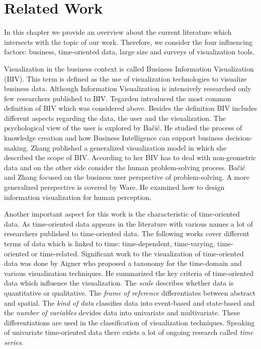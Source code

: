 \chapter{Related Work}
\label{chap:related Work}
In this chapter we provide an overview about the current literature which intersects with the topic of our work. Therefore, we consider the four influencing factors: business, time-oriented data, large size and surveys of visualization tools. 
\par
Visualization in the business context is called Business Information Visualization (BIV). This term is defined as the use of visualization technologies to visualize business data\cite{Tegarden1999}. Although Information Visualization is intensively researched\cite{Shneiderman2008,Shneiderman2002,Shneiderman1996,Keim2002} only few researchers published to BIV. Tegarden\cite{Tegarden1999} introduced the most common definition of BIV which was considered above.  Besides the definition BIV includes different aspects regarding the data, the user and the visualization. The psychological view of the user is explored by Bačić. He studied the process of knowledge creation\cite{Bacic2012} and how Business Intelligence can support business decision-making\cite{Bacic,Bacic2012}.  Zhang\cite{Zhang,Zhang1998,Zhang2001} published a generalized visualization model in which she described the scope of BIV. According to her BIV has to deal with non-geometric data and on the other side consider the human problem-solving process. Bačić and Zhang focused on the business user perspective of problem-solving. A more generalized perspective is covered by Ware\cite{Ware2012a}. He examined how to design information visualization for human perception.
\par
Another important aspect for this work is the characteristic of time-oriented data. As time-oriented data appears in the literature with various names a lot of researchers published to time-oriented data. The following works cover different terms of data which is linked to time:  time-dependent\cite{Postfach2003, Tominski2005,Kriglstein2014,Aigner2007,VanBuuren2001,FerreiradeOliveira2003,Yang2003,Chung2014,Rind2011}, time-varying\cite{Moere2004}, time-oriented\cite{Aigner2008,Aigner2007,Aigner2011,Hinum2005,Walker} or time-related\cite{Keimc}. Significant work to the visualization of time-oriented data was done by Aigner\cite{Aigner2011,Aigner2008,Aigner2007} who proposed a taxonomy for the time-domain and various visualization techniques. He summarized the key criteria of time-oriented data which influence the visualization. The \textit{scale} describes whether data is quantitative or qualitative. The \textit{frame of reference} differentiates between abstract and spatial. The \textit{kind of data} classifies data into event-based and state-based and the \textit{number of variables} devides data into univariate and multivariate. These differentiations are used in the classification of visualization techniques.  Speaking of univariate time-oriented data there exists a lot of ongoing research called \textit{time series}\cite{Aigner2011, Buono, Walker,Leonard,Chen1993,Esling2012}.
